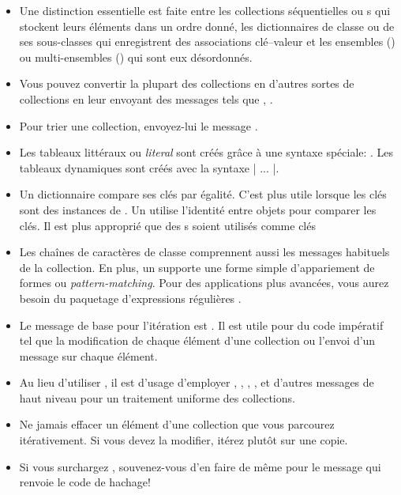 \documentclass[a4paper,10pt,twoside]{book}
\begin{document}
\begin{itemize}
  \item Une distinction essentielle est faite entre les collections séquentielles ou 
s qui stockent leurs éléments dans un ordre
donné, les dictionnaires de classe  ou de ses sous-classes qui
enregistrent des associations clé--valeur et les ensembles 
() ou multi-ensembles () qui sont eux désordonnés.
  \item Vous pouvez convertir la plupart des collections en d'autres sortes de 
collections en leur envoyant des messages tels que ,  \etc.
  \item Pour trier une collection, envoyez-lui le message .
  \item Les tableaux littéraux ou \emph{literal}  sont créés 
grâce à une syntaxe spéciale: .  Les tableaux dynamiques
sont créés avec la syntaxe \ct|{ ... }|.
  \item Un dictionnaire  compare ses clés par égalité.
C'est plus utile lorsque les clés sont des instances de . 
Un  utilise l'identité entre objets pour comparer les clés. Il est plus approprié que des s soient utilisés comme clés 
  \item Les chaînes de caractères de classe  comprennent
aussi les messages habituels de la collection. En plus, un  
supporte une forme simple d'appariement de formes ou \emph{pattern-matching}. 
Pour des applications plus avancées, vous aurez besoin du paquetage d'expressions régulières .
  \item Le message de base pour l'itération est . Il est 
utile pour du code impératif tel que la modification de chaque élément d'une collection ou l'envoi d'un message sur chaque élément.
  \item Au lieu d'utiliser , il est d'usage d'employer , , , ,  et d'autres messages de haut niveau pour un traitement uniforme des collections.
  \item Ne jamais effacer un élément d'une collection que vous parcourez itérativement. Si vous devez la modifier, itérez plutôt sur une copie.
  \item Si vous surchargez \ct{=}, souvenez-vous d'en faire de même pour le message  
qui renvoie le code de hachage!
\end{itemize}

\ifx\wholebook\relax\else
   
   
\end{document}
